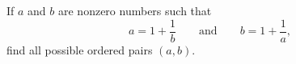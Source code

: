 If $a$ and $b$ are nonzero numbers such that
\[a=1+\dfrac{1}{b}\qquad\text{and}\qquad b=1+\dfrac{1}{a},\]
find all possible ordered pairs $(a,b)$.
